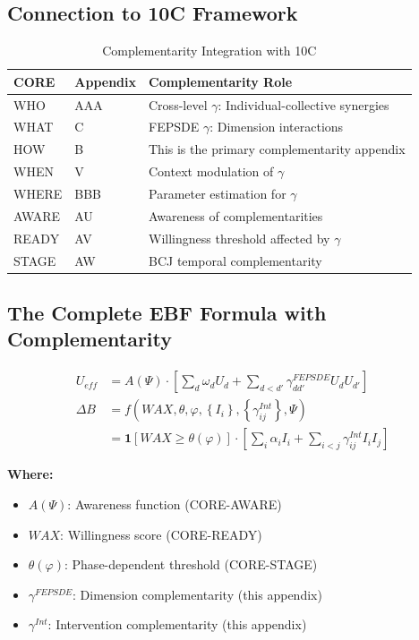 \subsection{Connection to 10C Framework}

\begin{table}[h]
\centering
\caption{Complementarity Integration with 10C}
\label{tab:10c-integration}
\renewcommand{\arraystretch}{1.3}
\small
\begin{tabular}{@{}llp{6cm}@{}}
\toprule
\textbf{CORE} & \textbf{Appendix} & \textbf{Complementarity Role} \\
\midrule
WHO & AAA & Cross-level $\gamma$: Individual-collective synergies \\
WHAT & C & FEPSDE $\gamma$: Dimension interactions \\
HOW & B & This is the primary complementarity appendix \\
WHEN & V & Context modulation of $\gamma$ \\
WHERE & BBB & Parameter estimation for $\gamma$ \\
AWARE & AU & Awareness of complementarities \\
READY & AV & Willingness threshold affected by $\gamma$ \\
STAGE & AW & BCJ temporal complementarity \\
\bottomrule
\end{tabular}
\end{table}

\subsection{The Complete EBF Formula with Complementarity}

\begin{tcolorbox}[colback=blue!5!white,colframe=blue!75!black,title=\textbf{Master EBF Equation with Complementarity}]
\begin{align}
U_{eff} &= A(\Psi) \cdot \left[ \sum_d \omega_d U_d + \sum_{d<d'} \gamma^{FEPSDE}_{dd'} U_d U_{d'} \right] \\[1em]
\Delta B &= f\left( WAX, \theta, \varphi, \left\{ I_i \right\}, \left\{ \gamma^{Int}_{ij} \right\}, \Psi \right) \\[1em]
&= \mathbf{1}[WAX \geq \theta(\varphi)] \cdot \left[ \sum_i \alpha_i I_i + \sum_{i<j} \gamma^{Int}_{ij} I_i I_j \right]
\end{align}

\textbf{Where:}
\begin{itemize}[noitemsep]
    \item $A(\Psi)$: Awareness function (CORE-AWARE)
    \item $WAX$: Willingness score (CORE-READY)
    \item $\theta(\varphi)$: Phase-dependent threshold (CORE-STAGE)
    \item $\gamma^{FEPSDE}$: Dimension complementarity (this appendix)
    \item $\gamma^{Int}$: Intervention complementarity (this appendix)
\end{itemize}
\end{tcolorbox}

